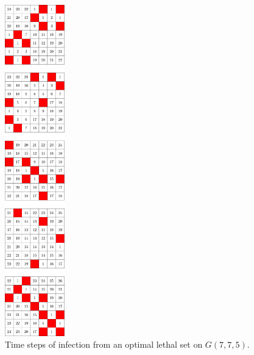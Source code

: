 \begin{figure}[H]
\centering
\includegraphics[width=0.23\textwidth]{figures/A/7x7x5_numbered_heatmap.pdf}
\caption{Time steps of infection from an optimal lethal set on $G(7,7,5)$.}
\label{fig:7x7x5_numbered_heatmap}
\end{figure}


